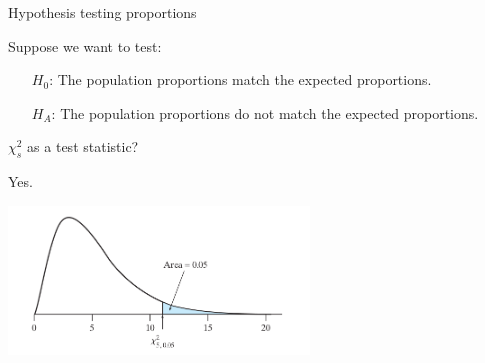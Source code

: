 \begin{frame}{Hypothesis testing proportions}

  Suppose we want to test:
  \begin{itemize}
    \item[$H_0$:] The population proportions match the expected proportions.
    \item[$H_A$:] The population proportions \alert{do not} match the expected proportions.
  \end{itemize}

  \vspace{2em}
   $\chi^2_s$ as a test statistic?
  \pause

  \vspace{1em}
  \alert{Yes.} 
  \pause
  
  \begin{center}
    \includegraphics[width=0.6\textwidth]{fig9_4_4-chisq-histo}
  \end{center}

\end{frame}


